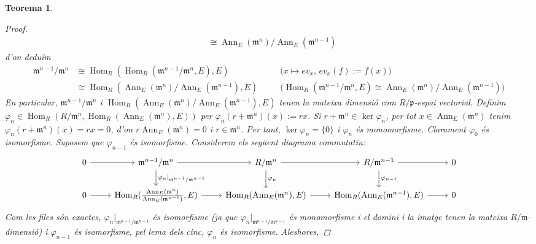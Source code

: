 \documentclass[compress]{article}
\newtheorem{teorema}{Teorema}
\theoremstyle{definition}
\DeclareMathOperator{\Hom}{Hom}
\DeclareMathOperator{\Ann}{Ann}
\begin{document}
\begin{teorema}
\begin{proof}
\begin{align*}
            &\cong\Ann_{E}(\mathfrak{m}^{n})/\Ann_{E}(\mathfrak{m}^{n-1})
        \end{align*}
        d'on deduïm
        \begin{align*}
            \mathfrak{m}^{n-1}/\mathfrak{m}^{n}
            &\cong\Hom_{R}(\Hom_{R}(\mathfrak{m}^{n-1}/\mathfrak{m}^{n},E),E)
            &\quad&\textrm{($x\mapsto ev_{x}$, $ev_{x}(f):=f(x)$)}\\
            &\cong\Hom_{R}(\Ann_{E}(\mathfrak{m}^{n})/\Ann_{E}(\mathfrak{m}^{n-1}),E)
            &\quad&\textrm{($\Hom_{R}(\mathfrak{m}^{n-1}/\mathfrak{m}^{n},E)\cong\Ann_{E}(\mathfrak{m}^{n})/\Ann_{E}(\mathfrak{m}^{n-1})$)}
        \end{align*}
        En particular, $\mathfrak{m}^{n-1}/\mathfrak{m}^{n}$ i $\Hom_{R}(\Ann_{E}(\mathfrak{m}^{n})/\Ann_{E}(\mathfrak{m}^{n-1}),E)$ tenen la mateixa dimensió com $R/\mathfrak{p}$-espai vectorial. Definim $\varphi_{n}\in\Hom_{R}(R/\mathfrak{m}^{n},\Hom_{R}(\Ann_{E}(\mathfrak{m}^{n}),E))$ per $\varphi_{n}(r+\mathfrak{m}^{n})(x):=rx$. Si $r+\mathfrak{m}^{n}\in\ker{\varphi_{n}}$, per tot $x\in\Ann_{E}(\mathfrak{m}^{n})$ tenim $\varphi_{n}(r+\mathfrak{m}^{n})(x)=rx=0$, d'on $r\Ann_{E}(\mathfrak{m}^{n})=0$ i $r\in\mathfrak{m}^{n}$. Per tant, $\ker{\varphi_{n}}=\{0\}$ i $\varphi_{n}$ és monomorfisme. Clarament $\varphi_{0}$ és isomorfisme. Suposem que $\varphi_{n-1}$ és isomorfisme. Considerem els següent diagrama commutatiu:
        \begin{equation*}
        \begin{tikzcd}
            0
            \arrow{r}
            &\mathfrak{m}^{n-1}/\mathfrak{m}^{n}
            \arrow{r}
            \arrow{d}{\varphi_{n}|_{\mathfrak{m}^{n-1}/\mathfrak{m}^{n-1}}}
            &R/\mathfrak{m}^{n}
            \arrow{r}
            \arrow{d}{\varphi_{n}}
            &R/\mathfrak{m}^{n-1}
            \arrow{r}
            \arrow{d}{\varphi_{n-1}}
            &0\\
            0
            \arrow{r}
            &\Hom_{R}(\tfrac{\Ann_{E}(\mathfrak{m}^{n})}{\Ann_{E}(\mathfrak{m}^{n-1})},E)
            \arrow{r}
            &\Hom_{R}(\Ann_{E}(\mathfrak{m}^{n}),E)
            \arrow{r}
            &\Hom_{R}(\Ann_{E}(\mathfrak{m}^{n-1}),E)
            \arrow{r}
            &0
        \end{tikzcd}
        \end{equation*}
        Com les files són exactes, $\varphi_{n}|_{\mathfrak{m}^{n-1}/\mathfrak{m}^{n-1}}$ és isomorfisme (ja que $\varphi_{n}|_{\mathfrak{m}^{n-1}/\mathfrak{m}^{n-1}}$ és monomorfisme i el domini i la imatge tenen la mateixa $R/\mathfrak{m}$-dimensió) i $\varphi_{n-1}$ és isomorfisme, pel lema dels cinc, $\varphi_{n}$ és isomorfisme. Aleshores,

\end{proof}
\end{teorema}
\end{document}
